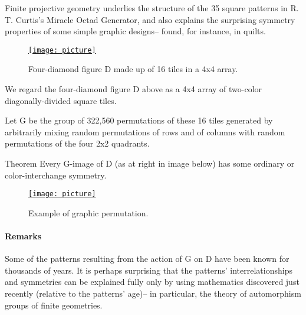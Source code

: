 \documentclass[12pt]{article}
\begin{document}
Finite projective geometry underlies the structure of the 35 square patterns in R. T. Curtis's Miracle Octad Generator, and also explains the surprising symmetry properties of some simple graphic designs-- found, for instance, in quilts.

\begin{figure}
\begin{center}

     \href{https://user-images.githubusercontent.com/1908511/78737633-fa629a80-791d-11ea-87bc-252e7a874eab.jpg}
          {\texttt{[image: picture]}}

\end{center}
\caption{Four-diamond figure D made up of 16 tiles in a 4x4 array.}
\end{figure}

We regard the four-diamond figure D above as a 4x4 array of two-color diagonally-divided square tiles.

Let G be the group of 322,560 permutations of these 16 tiles generated by arbitrarily mixing random permutations of rows and of columns with random permutations of the four 2x2 quadrants.

\begin{paragraph}{Theorem} Every G-image of D (as at right in image below) has some ordinary or color-interchange symmetry.
\end{paragraph}

\begin{figure}
\begin{center}

\href{https://user-images.githubusercontent.com/1908511/78737759-4f9eac00-791e-11ea-8a86-0e4d6c8d50a3.jpg}
{\texttt{[image: picture]}}

\end{center}
\caption{Example of graphic permutation.}
\end{figure}

\paragraph{Remarks}

Some of the patterns resulting from the action of G on D have been known for thousands of years. It is perhaps surprising that the patterns' interrelationships and symmetries can be explained fully only by using mathematics discovered just recently (relative to the patterns' age)-- in particular, the theory of automorphism groups of finite geometries.
\end{document}

